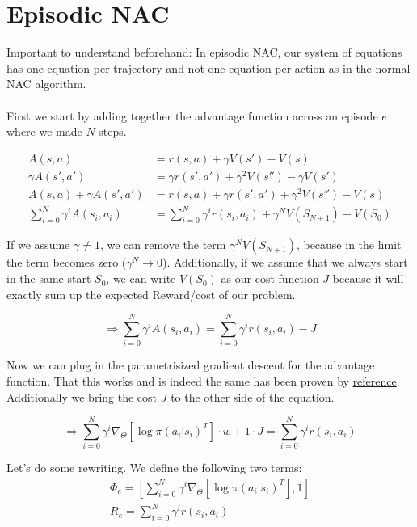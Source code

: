 
\section{Episodic NAC}
Important to understand beforehand: In episodic NAC, our system of equations has one equation per trajectory and not one equation per action as in the normal NAC algorithm.
\\\\
First we start by adding together the advantage function across an episode $e$ where we made $N$ steps.

\begin{align}
	A(s,a) &= r(s,a) + \gamma V(s') - V(s) \\
	\gamma A(s',a') &= \gamma r(s', a') + \gamma^2V(s'') - \gamma V(s') \\
	A(s, a) + \gamma A(s', a') &= r(s,a) + \gamma r(s',a') + \gamma^2 V(s'') - V(s) \\
	\sum_{i = 0}^{N}\gamma^i A(s_i, a_i) &= \sum_{i = 0}^{N}\gamma^i r(s_i, a_i) + \gamma^N V(S_{N+1}) - V(S_0)
\end{align}

\noindent If we assume $\gamma \neq 1$, we can remove the term $\gamma^N V(S_{N+1})$, because in the limit the term becomes zero ($\gamma^N \rightarrow 0$). Additionally, if we assume that we always start in the same start $S_0$, we can write $V(S_0)$ as our cost function $J$ because it will exactly sum up the expected Reward/cost of our problem.

\begin{equation}
	\Rightarrow \sum_{i = 0}^{N}\gamma^i A(s_i, a_i) = \sum_{i = 0}^{N}\gamma^i r(s_i, a_i) - J
\end{equation}

\noindent Now we can plug in the parametrisized gradient descent for the advantage function. That this works and is indeed the same has been proven by \underline{reference}. Additionally we bring the cost $J$ to the other side of the equation.

\begin{equation}
	\label{equ:someequ}
	\Rightarrow \sum_{i = 0}^{N} \gamma^i \nabla_{\Theta} \left[\log \pi(a_i | s_i)^T\right] \cdot w + 1 \cdot J = \sum_{i = 0}^{N}\gamma^i r(s_i, a_i)
\end{equation}

\noindent Let's do some rewriting. We define the following two terms:
\begin{align}
	\Phi_e = \left[  \sum_{i = 0}^{N} \gamma^i \nabla_{\Theta} \left[\log \pi(a_i | s_i)^T\right] , 1 \right]\\
	R_e = \sum_{i = 0}^{N}\gamma^i r(s_i, a_i)
\end{align}

